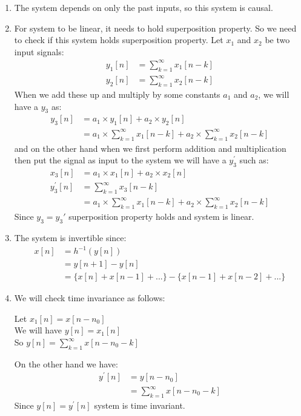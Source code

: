 \documentclass[10pt,a4paper, margin=1in]{article}
\begin{document}
\begin{enumerate}
\begin{enumerate}
\begin{enumerate}
        \item
        The system depends on only the past inputs, so this system is causal.
        \item For system to be linear, it needs to hold superposition property. So we need to check if this system holds superposition property. Let $x_1$ and $x_2$ be two input signals:
            \begin{align*}
            y_1[n] & = \sum_{k=1}^{\infty} x_1[n - k] \\
            y_2[n] & = \sum_{k=1}^{\infty} x_2[n - k]
            \end{align*}
            When we add these up and multiply by some constants $a_1$ and $a_2$, we will have a $y_3$ as:
            \begin{align*}
            y_3[n] &= a_1 \times y_1[n] + a_2 \times y_2[n] \\
                   &= a_1 \times \sum_{k=1}^{\infty} x_1[n - k] + a_2 \times \sum_{k=1}^{\infty} x_2[n - k]
            \end{align*}
            and on the other hand when we first perform addition and multiplication then put the signal as input to the system we will have a $y_3^{'}$ such as:
            \begin{align*}
                x_3[n] &= a_1\times x_1[n] + a_2\times x_2[n] \\
                y_3^{'}[n] &= \sum_{k=1}^{\infty} x_3[n - k]\\
                &= a_1\times \sum_{k=1}^{\infty} x_1[n - k] + a_2 \times \sum_{k=1}^{\infty} x_2[n -k]
            \end{align*}
            Since $y_3 = y_3'$ superposition property holds and system is linear. \\
        \item The system is invertible since:
        \begin{align*}
        x[n] &= h^{-1}(y[n]) \\
             &= y[n + 1] - y[n] \\
             &= \{x[n] + x[n-1] + ...\} - \{x[n-1] + x[n-2] + ...\} 
        \end{align*}
        
        \item We will check time invariance as follows:
        \begin{center}
        Let $x_1[n] = x[n-n_0]$ \\
        We will have $y[n]= x_1[n]$ \\
        So $y[n] = \sum_{k=1}^{\infty} x[n - n_0 - k]$
        \end{center}
        On the other hand we have: 
        \begin{align*}
        y^{'}[n] &= y[n-n_0]  \\
                 &= \sum_{k=1}^{\infty} x[n - n_0 - k] 
        \end{align*}
        Since $y[n] = y^{'}[n]$ system is time invariant.
        
    \end{enumerate}
    \end{enumerate}

\end{enumerate}
\end{document}
